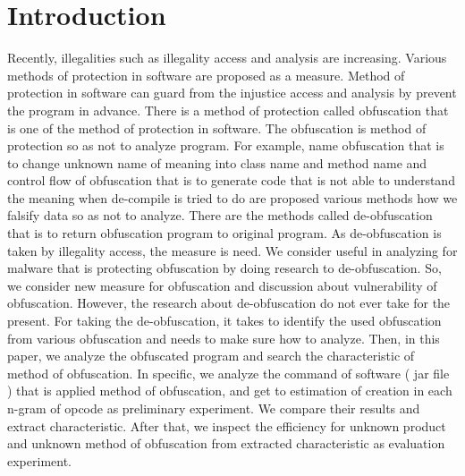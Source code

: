 \documentclass[conference]{IEEEtran}
\begin{document}
\section{Introduction}
Recently, illegalities such as illegality access and analysis are increasing.
Various methods of protection in software are proposed as a measure.
Method of protection in software can guard from the injustice access and analysis by prevent the program in advance.
There is a method of protection called obfuscation that is one of the method of protection in software.
The obfuscation is method of protection so as not to analyze program.
%
For example, name obfuscation that is to change unknown name of meaning into class name and method name and control flow of obfuscation that is to generate code that is not able to understand the meaning when de-compile is tried to do are proposed various methods how we falsify data so as not to analyze.
There are the methods called de-obfuscation that is to return obfuscation program to original program.
As de-obfuscation is taken by illegality access, the measure is need.
We consider useful in analyzing for malware that is protecting obfuscation by doing research to de-obfuscation.
So, we consider new measure for obfuscation and discussion about vulnerability of obfuscation.
However, the research about de-obfuscation do not ever take for the present.
For taking the de-obfuscation, it takes to identify the used obfuscation from various obfuscation and needs to make sure how to analyze.
Then, in this paper, we analyze the obfuscated program and search the characteristic of method of obfuscation.
In specific, we analyze the command of software ( jar file ) that is applied method of obfuscation, and get to estimation of creation in each n-gram of opcode as preliminary experiment.
We compare their results and extract characteristic.
After that, we inspect the efficiency for unknown product and unknown method of obfuscation from extracted characteristic as evaluation experiment.


 

\end{document}
